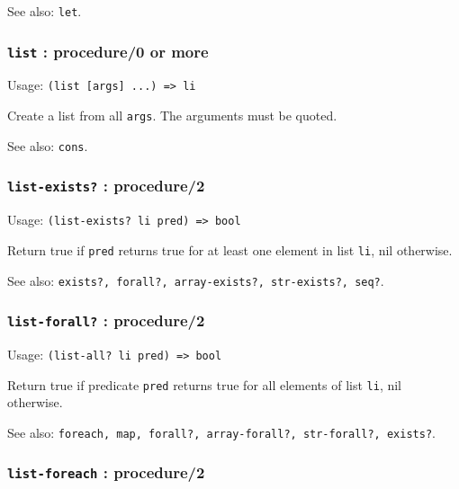 \documentclass[
]{article}
\newcommand{\passthrough}[1]{#1}
\begin{document}
See also: \passthrough{\lstinline!let!}.

\hypertarget{list-procedure0-or-more}{%
\subsubsection{\texorpdfstring{\texttt{list} : procedure/0 or
more}{list : procedure/0 or more}}\label{list-procedure0-or-more}}

Usage: \passthrough{\lstinline!(list [args] ...) => li!}

Create a list from all \passthrough{\lstinline!args!}. The arguments
must be quoted.

See also: \passthrough{\lstinline!cons!}.

\hypertarget{list-exists-procedure2}{%
\subsubsection{\texorpdfstring{\texttt{list-exists?} :
procedure/2}{list-exists? : procedure/2}}\label{list-exists-procedure2}}

Usage: \passthrough{\lstinline!(list-exists? li pred) => bool!}

Return true if \passthrough{\lstinline!pred!} returns true for at least
one element in list \passthrough{\lstinline!li!}, nil otherwise.

See also:
\passthrough{\lstinline!exists?, forall?, array-exists?, str-exists?, seq?!}.

\hypertarget{list-forall-procedure2}{%
\subsubsection{\texorpdfstring{\texttt{list-forall?} :
procedure/2}{list-forall? : procedure/2}}\label{list-forall-procedure2}}

Usage: \passthrough{\lstinline!(list-all? li pred) => bool!}

Return true if predicate \passthrough{\lstinline!pred!} returns true for
all elements of list \passthrough{\lstinline!li!}, nil otherwise.

See also:
\passthrough{\lstinline!foreach, map, forall?, array-forall?, str-forall?, exists?!}.

\hypertarget{list-foreach-procedure2}{%
\subsubsection{\texorpdfstring{\texttt{list-foreach} :
procedure/2}{list-foreach : procedure/2}}\label{list-foreach-procedure2}}
\end{document}
